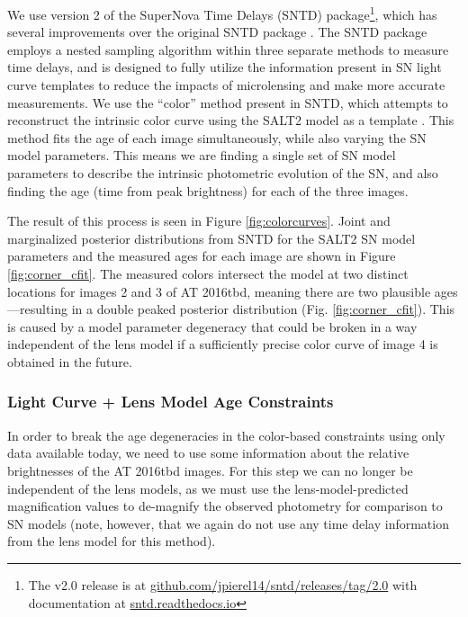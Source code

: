 \documentclass[12pt]{article}
\def\SNABC{AT 2016tbd\xspace}
\begin{document}
We use version 2 of the SuperNova Time Delays (SNTD) package\footnote{The v2.0 release is at \href{https://github.com/jpierel14/sntd/releases/tag/2.0}{github.com/jpierel14/sntd/releases/tag/2.0} with documentation at 
\href{https://sntd.readthedocs.io/en/latest/}{sntd.readthedocs.io}}, which has several improvements over the original SNTD package \cite{pierel_turning_2019}. The SNTD package employs a nested sampling algorithm within three separate methods to measure time delays, and is designed to fully utilize the information present in SN light curve templates \cite{hsiao_k_2007,guy_salt2:_2007,kessler_results_2010,pierel_extending_2018} to reduce the impacts of microlensing and make more accurate measurements. We use the ``color'' method present in SNTD, which attempts to reconstruct the intrinsic color curve using the SALT2 model as a template \cite{guy_salt2:_2007}. This method fits the age of each image simultaneously, while also varying the SN model parameters.  This means we are finding a single set of SN model parameters to describe the intrinsic photometric evolution of the SN, and also finding the age (time from peak brightness) for each of the three images. 

The result of this process is seen in Figure \ref{fig:colorcurves}.  Joint and marginalized posterior distributions
from SNTD for the SALT2 SN model parameters and the measured ages for each image are shown in Figure \ref{fig:corner_cfit}.  The measured colors intersect the model at two distinct locations for images 2 and 3 of \SNABC, meaning there are two plausible ages---resulting in a double peaked posterior distribution (Fig. \ref{fig:corner_cfit}). This is caused by a model parameter degeneracy that could be broken in a way independent of the lens model if a sufficiently precise color curve of image 4 is obtained in the future.


\subsubsection*{Light Curve + Lens Model Age Constraints}

In order to break the age degeneracies in the color-based constraints using only data available today, we need to use some information about the relative brightnesses of the \SNABC images.  For this step we can no longer be independent of the lens models, as we must use the lens-model-predicted magnification values to de-magnify the observed photometry for comparison to SN models (note, however, that we again do not use any time delay information from the lens model for this method).
\end{document}
